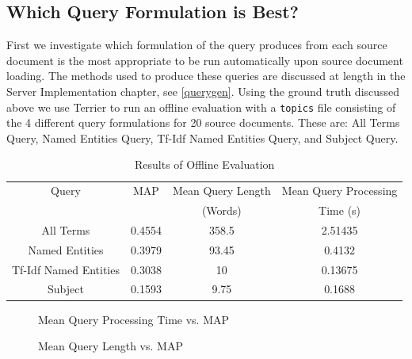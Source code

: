 \documentclass{l4proj}
\newcommand{\code}[1]{\texttt{#1}}
\begin{document}
\subsection{Which Query Formulation is Best?} \label{whichquery}
First we investigate which formulation of the query produces from each source document is the most appropriate to be run automatically upon source document loading. The methods used to produce these queries are discussed at length in the Server Implementation chapter, see \ref{querygen}.
Using the ground truth discussed above we use Terrier to run an offline evaluation with a \code{topics} file consisting of the 4 different query formulations for 20 source documents. These are: All Terms Query, Named Entities Query, Tf-Idf Named Entities Query, and Subject Query.
\begin{center}
\begin{table}[h]
\centering
\begin{tabular}{|c|c|c|c|}
\hline
Query                 & MAP    & Mean Query Length & Mean Query Processing \\ 
& & (Words) & Time (s) \\\hline
All Terms             & 0.4554 & 358.5             & 2.51435                        \\ \hline
Named Entities        & 0.3979 & 93.45             & 0.4132                         \\ \hline
Tf-Idf Named Entities & 0.3038 & 10                & 0.13675                       \\ \hline
Subject               & 0.1593 & 9.75              & 0.1688                        \\ \hline
\end{tabular}
\caption{Results of Offline Evaluation}
\label{standard_results}
\end{table}
\end{center}

\begin{figure}[h]
\caption{Mean Query Processing Time vs. MAP} \label{fig: timegraph}
\end{figure}
\bigskip
\begin{figure}[h!]
\caption{Mean Query Length vs. MAP} \label{fig: lengthgraph}
\end{figure}
\end{document}

